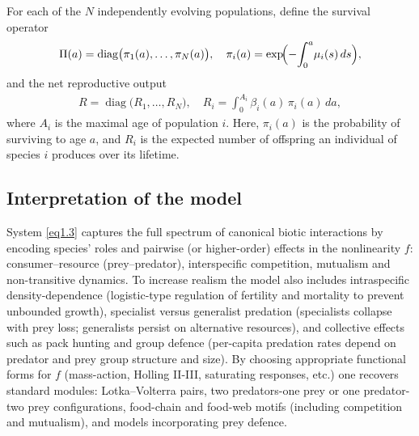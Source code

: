 \documentclass[10pt, a4paper]{amsart}
\theoremstyle{plain}
\theoremstyle{definition}
\theoremstyle{remark}
\numberwithin{equation}{section}
\begin{document}
For each of the $N$ independently evolving populations, define the  survival operator
\begin{align}\label{equation1.6}
\Pi(a) = \operatorname{diag}\bigl(\pi_1(a),\dots,\pi_N(a)\bigr),
\quad
\pi_i(a) = \exp\!\Bigl(-\!\int_0^a\!\mu_i(s)\,ds\Bigr),
\end{align}
and the net reproductive output
\begin{align}
    R = \operatorname{diag}\bigl(R_1,\dots,R_N\bigr),
\quad
R_i = \int_0^{A_i}\!\beta_i(a)\,\pi_i(a)\,da,
\end{align}
where \(A_i\) is the maximal age of population \(i\). Here, \(\pi_i(a)\) is the probability of surviving to age \(a\), and \(R_i\) is the expected number of offspring an individual of species \(i\) produces over its lifetime.


\subsection*{\bf Interpretation of the model}
System \eqref{eq1.3} captures the full spectrum of canonical biotic interactions by encoding species’ roles and pairwise (or higher-order) effects in the nonlinearity $f$: consumer–resource (prey–predator), interspecific competition, mutualism and non-transitive dynamics. To increase realism the model also includes intraspecific density-dependence (logistic-type regulation of fertility and mortality to prevent unbounded growth),  specialist versus generalist predation (specialists collapse with prey loss; generalists persist on alternative resources), and  collective effects such as pack hunting and group defence (per-capita predation rates depend on predator and prey group structure and size). By choosing appropriate functional forms for $f$ (mass-action, Holling II-III, saturating responses, etc.) one recovers standard modules: Lotka–Volterra pairs, two predators-one prey or one predator-two prey configurations, food-chain and food-web motifs (including competition and mutualism), and models incorporating prey defence.
\end{document}
